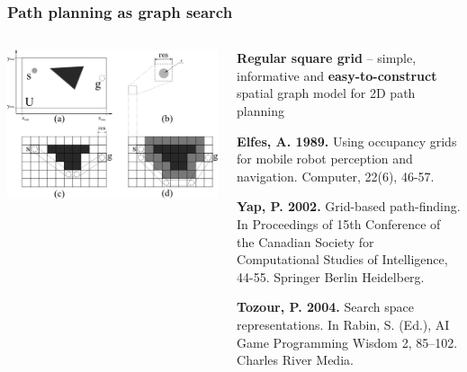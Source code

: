\documentclass[default]{beamer}
\begin{document}
	\begin{frame}
		\frametitle{Path planning as graph search}
		
		\begin{columns}
			\begin{column}{0.55\textwidth}
				\includegraphics[width=\textwidth]{strl/path_grid.png}
			\end{column}
			\begin{column}{0.45\textwidth}
				\begin{minipage}[t][.6\textheight]{\textwidth}
					\textbf{Regular square grid} -- simple, informative and \textbf{easy-to-construct} spatial graph model for 2D path planning
					\vfill

					\fontsize{6}{7.2}\selectfont
					\textbf{Elfes, A. 1989.} Using occupancy grids for mobile robot perception and navigation. Computer, 22(6), 46-57.
					\par\medskip
					\textbf{Yap, P. 2002.} Grid-based path-finding. In Proceedings of 15th Conference of the Canadian Society for Computational Studies of Intelligence, 44-55. Springer Berlin Heidelberg.
					\par\medskip
					\textbf{Tozour, P. 2004.} Search space representations. In Rabin, S. (Ed.), AI Game Programming Wisdom 2, 85–102. Charles River Media.
				\end{minipage}
			\end{column}
		\end{columns}
	\end{frame}
\end{document}
